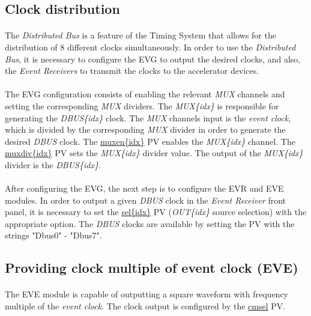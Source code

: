 \documentclass[openany]{article}
\begin{document}
	\subsection{Clock distribution}
		\paragraph{} The \emph{Distributed Bus} is a feature of the Timing System that allows for the distribution of 8 different clocks simultaneously. In order to use the \emph{Distributed Bus}, it is necessary to configure the EVG to output the desired clocks, and also, the \emph{Event Receivers} to transmit the clocks to the accelerator devices.
		\paragraph{} The EVG configuration consists of enabling the relevant \emph{MUX} channels and setting the corresponding \emph{MUX} dividers. The \emph{MUX\{idx\}} is responsible for generating the \emph{DBUS\{idx\}} clock. The \emph{MUX} channels input is the \emph{event clock}, which is divided by the corresponding \emph{MUX} divider in order to generate the desired \emph{DBUS} clock. The \hyperref[pvgroup:evg-mux]{muxen\{idx\}} PV enables the \emph{MUX\{idx\}} channel. The \hyperref[pvgroup:evg-mux]{muxdiv\{idx\}} PV sets the \emph{MUX\{idx\}} divider value. The output of the \emph{MUX\{idx\}} divider is the \emph{DBUS\{idx\}}.
		\paragraph{} After configuring the EVG, the next step is to configure the EVR and EVE modules. In order to output a given \emph{DBUS} clock in the \emph{Event Receiver} front panel, it is necessary to set the \hyperref[pvgroup:evre-out]{sel\{idx\}} PV (\emph{OUT\{idx\}} source selection) with the appropriate option. The \emph{DBUS} clocks are available by setting the PV with the strings "Dbus0" - "Dbus7".

	\subsection{Providing clock multiple of event clock (EVE)}
		\paragraph{} The EVE module is capable of outputting a square waveform with frequency multiple of the \emph{event clock}. The clock output is configured by the \hyperref[pvgroup:eve-rf-output]{cmsel} PV.
\end{document}
